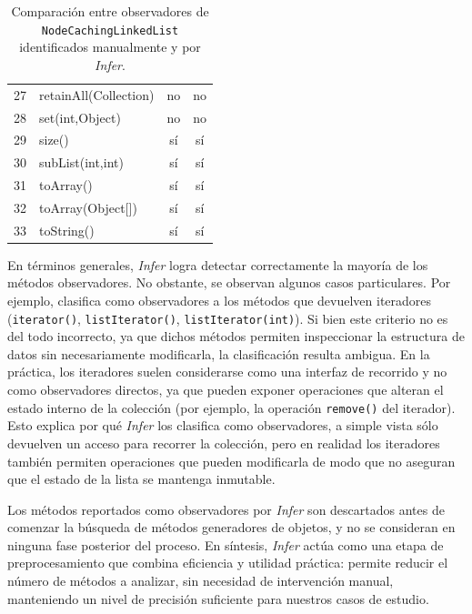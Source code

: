 \begin{table}[H]
\begin{tabular}{clcc}
27 & retainAll(Collection)        & no  & no \\
28 & set(int,Object)              & no  & no \\
29 & size()                       & sí  & sí \\
30 & subList(int,int)             & sí  & sí \\
31 & toArray()                    & sí  & sí \\
32 & toArray(Object[])            & sí  & sí \\
33 & toString()                   & sí  & sí \\
\bottomrule
\end{tabular}
\caption{Comparación entre observadores de \texttt{NodeCachingLinkedList} identificados manualmente y por \emph{Infer}.}
\label{tab:ncl-infer-comparacion}
\end{table}

En términos generales, \emph{Infer} logra detectar correctamente la mayoría de los métodos observadores. 
No obstante, se observan algunos casos particulares. 
Por ejemplo, clasifica como observadores a los métodos que devuelven iteradores 
(\texttt{iterator()}, \texttt{listIterator()}, \texttt{listIterator(int)}). 
Si bien este criterio no es del todo incorrecto, ya que dichos métodos permiten inspeccionar 
la estructura de datos sin necesariamente modificarla, la clasificación resulta ambigua. 
En la práctica, los iteradores suelen considerarse como una interfaz de recorrido y no como observadores directos, 
ya que pueden exponer operaciones que alteran el estado interno de la colección 
(por ejemplo, la operación \texttt{remove()} del iterador). 
Esto explica por qué \emph{Infer} los clasifica como observadores,
a simple vista sólo devuelven un acceso para recorrer la colección, 
pero en realidad los iteradores también permiten operaciones que pueden modificarla 
de modo que no aseguran que el estado de la lista se mantenga inmutable.

Los métodos reportados como observadores por \emph{Infer} son descartados antes de comenzar la búsqueda de métodos generadores de objetos, y no se consideran en ninguna fase posterior del proceso.
En síntesis, \emph{Infer} actúa como una etapa de preprocesamiento que combina eficiencia y utilidad práctica: permite reducir el número de métodos a analizar, sin necesidad de intervención manual, manteniendo un nivel de precisión suficiente para nuestros casos de estudio.




